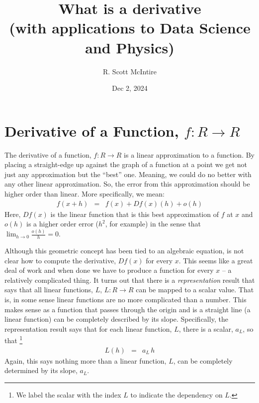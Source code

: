 \documentclass{article}
\title{What is a derivative \\ (with applications to Data Science and Physics)}
\author{R. Scott McIntire}
\date{Dec 2, 2024}
\begin{document}
\maketitle

\section{Derivative of a Function, $f: R\rightarrow R$}
The derivative of a function, $f : R \rightarrow R$ is a linear approximation to
a function. By placing a straight-edge up against the graph of a function at
a point we get not just any approximation but the ``best''{} one. Meaning,
we could do no better with any other linear approximation. So, the error
from this approximation should be higher order than linear. More specifically,
we mean:
\begin{eqnarray}
f(x + h) & = & f(x) + Df(x)(h) + o(h) \label{simderdef}
\end{eqnarray}
Here, $Df(x)$ is the linear function that is this best approximation of $f$ at $x$
and $o(h)$ is a higher order error ($h^2$, for example) in the sense that
$\lim_{h\rightarrow 0} \frac{o(h)}{h} = 0$.

Although this geometric concept has been tied to an algebraic equation,
is not clear how to compute the derivative, $Df(x)$ for every $x$. This seems
like a great deal of work and when done we have to produce a function for
every $x$ -- a relatively complicated thing. It turns out that there is a
{\em representation\/} result that says that all linear functions, $L$,
$L: R \rightarrow R$ can be mapped to a scalar value. That is, in some sense
linear functions are no more complicated than a number. This makes sense
as a function that passes through the origin and is a straight line (a linear function)
can be completely described by its slope.
Specifically, the representation result says that 
for each linear function, $L$, there is a scalar, $a_L$, so that%
\footnote{We label the scalar with the index $L$ to indicate the dependency on $L$.}
\begin{eqnarray}
  L(h) & = & a_L \, h
\end{eqnarray}
Again, this says nothing more than a linear function, $L$, can be completely determined
by its slope, $a_L$.
\end{document}
